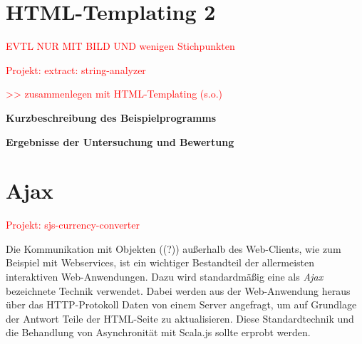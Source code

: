 \documentclass[a4paper, 12pt, hidelinks, listof=totoc, listoftables=totoc, bibliography=totoc]{scrreprt}
\newcommand{\TODO}[1]{\textcolor{red}{#1}\newline}
\newcommand{\MyMiniSec}[1]{\rmfamily\fontsize{12}{15}\selectfont
	\vspace{7pt}\textbf{#1} %
}
\begin{document}
\section{HTML-Templating 2}


\TODO{EVTL NUR MIT BILD UND wenigen Stichpunkten}

\TODO{Projekt: extract: string-analyzer}

\TODO{>> zusammenlegen mit HTML-Templating (s.o.)}

\MyMiniSec{Kurzbeschreibung des Beispielprogramms}
\MyMiniSec{Ergebnisse der Untersuchung und Bewertung}


\section{Ajax}


\TODO{Projekt: sjs-currency-converter}


Die Kommunikation mit Objekten ((?)) außerhalb des Web-Clients, wie zum Beispiel mit Webservices, ist ein wichtiger Bestandteil der allermeisten interaktiven Web-Anwendungen. Dazu wird standardmäßig eine als \emph{Ajax} bezeichnete Technik verwendet. Dabei werden aus der Web-Anwendung heraus über das HTTP-Protokoll Daten von einem Server angefragt, um auf Grundlage der Antwort Teile der \ac{HTML}-Seite zu aktualisieren. Diese Standardtechnik und die Behandlung von Asynchronität mit Scala.js sollte erprobt werden.

\end{document}
